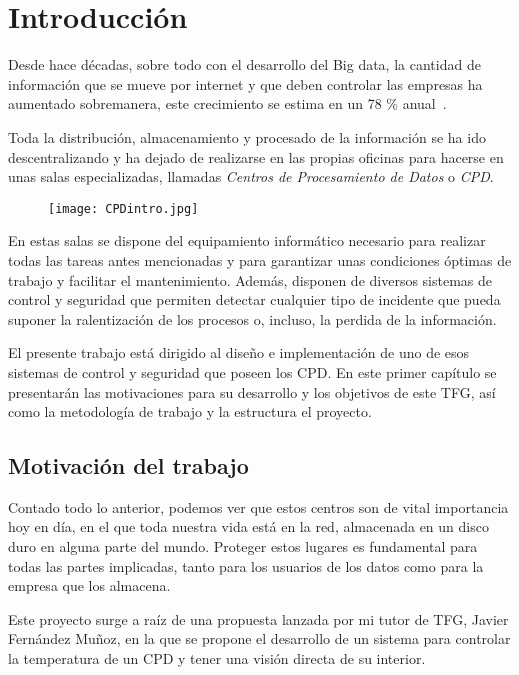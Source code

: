 \chapter{Introducción}
\label{ch:introduccion}
Desde hace décadas, sobre todo con el desarrollo del Big data, la cantidad de información que se mueve por internet y que deben controlar las empresas ha aumentado sobremanera, este crecimiento se estima en un 78 \% anual~\cite{monleon-getino_impacto_2015}.

Toda la distribución, almacenamiento y procesado de la información se ha ido descentralizando y ha dejado de realizarse en las propias oficinas para hacerse en unas salas especializadas, llamadas \textit{Centros de Procesamiento de Datos} o \textit{CPD}.
\begin{figure}[H]
	{\texttt{[image: CPDintro.jpg]}}\label{fig:ejemploCPD}
\end{figure}
En estas salas se dispone del equipamiento informático necesario para realizar todas las tareas antes mencionadas y para garantizar unas condiciones óptimas de trabajo y facilitar el mantenimiento. Además, disponen de diversos sistemas de control y seguridad que permiten detectar cualquier tipo de incidente que pueda suponer la ralentización de los procesos o, incluso, la perdida de la información.

El presente trabajo está dirigido al diseño e implementación de uno de esos sistemas de control y seguridad que poseen los CPD. En este primer capítulo se presentarán las motivaciones para su desarrollo y los objetivos de este TFG, así como la metodología de trabajo y la estructura el proyecto.

\section{Motivación del trabajo}\label{sec:motivación-del-trabajo}
Contado todo lo anterior, podemos ver que estos centros son de vital importancia hoy en día, en el que toda nuestra vida está en la red, almacenada en un disco duro en alguna parte del mundo. Proteger estos lugares es fundamental para todas las partes implicadas, tanto para los usuarios de los datos como para la empresa que los almacena.

Este proyecto surge a raíz de una propuesta lanzada por mi tutor de TFG, Javier Fernández Muñoz, en la que se propone el desarrollo de un sistema para controlar la temperatura de un CPD y tener una visión directa de su interior. 

